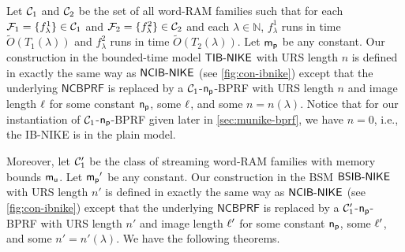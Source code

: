 Let $\mathcal{C}_1$ and $\mathcal{C}_2$ be the set of all word-RAM families such that for each $\mathcal{F}_1 = \{f_{\lambda}^1\} \in \mathcal{C}_1$ and $\mathcal{F}_2 = \{f_{\lambda}^2\} \in \mathcal{C}_2$ and each $\lambda \in \mathbb{N}$, $f_{\lambda}^1$ runs in time $\tilde{O}(T_1(\lambda))$ and $f_{\lambda}^2$ runs in time $\tilde{O}(T_2(\lambda))$. Let $\mathsf{m_p}$ be any constant.
Our construction in the bounded-time model $\mathsf{TIB\text{-}NIKE}$ with URS length $n$ is defined in exactly the same way as $\mathsf{NCIB\text{-}NIKE}$ (see \cref{fig:con-ibnike}) except that the underlying $\mathsf{NCBPRF}$ is replaced by a $\mathcal{C}_1$-$\mathsf{n_p}$-BPRF with URS length $n$ and image length $\ell$ for some constant $\mathsf{n_p}$, some $\ell$, and some $n = n(\lambda)$.
Notice that for our instantiation of $\mathcal{C}_1$-$\mathsf{n_p}$-BPRF given later in \cref{sec:munike-bprf}, we have $n=0$, i.e., the IB-NIKE is in the plain model.

Moreover, let $\mathcal{C}_1^{\prime}$ be the class of streaming word-RAM families with memory bounds $\mathsf{m_u}$. Let $\mathsf{m_p}'$ be any constant.
Our construction in the BSM $\mathsf{BSIB\text{-}NIKE}$ with URS length $n'$ is defined in exactly the same way as $\mathsf{NCIB\text{-}NIKE}$ (see \cref{fig:con-ibnike}) except that the underlying $\mathsf{NCBPRF}$ is replaced by a $\mathcal{C}_1^{\prime}$-$\mathsf{n_p}$-BPRF with URS length $n'$ and image length $\ell'$ for some constant $\mathsf{n_p}$, some $\ell'$, and some $n' = n'(\lambda)$. We have the following theorems.

